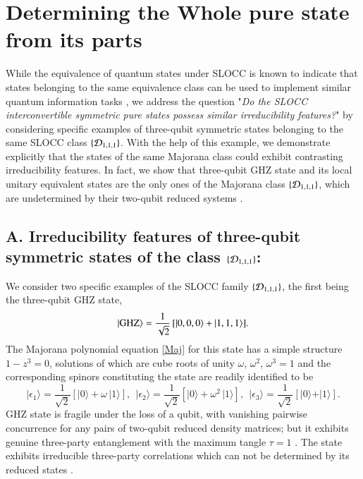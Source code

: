   
\section{Determining the Whole pure state from its parts}\label{chap29-eqIV} 

While the equivalence of quantum states under SLOCC is known to indicate that states belonging to the same equivalence class can be used to implement similar quantum information tasks \cite{Dur}, we address the question "{\emph{Do the {\rm SLOCC} interconvertible symmetric pure states possess similar irreducibility features?}}" by considering specific examples of three-qubit symmetric states belonging to the same SLOCC class $\{{\cal D}_{1,1,1}\}$.  With the help of this example, we demonstrate explicitly that the states of the same Majorana class could exhibit contrasting irreducibility features. In fact, we show that three-qubit GHZ state and its local unitary equivalent states are the only ones of the Majorana class $\{{\cal D}_{1,1,1}\}$,  which are undetermined by their two-qubit reduced systems \cite{SP1,Walck,Walck2}. 

\subsection*{A. Irreducibility features of three-qubit symmetric states of the class $\{{\cal D}_{1,1,1} \}$:}

We consider two specific examples of the SLOCC family $\{{\cal D}_{1,1,1}\}$,  the first being the three-qubit 
GHZ state,  
\begin{equation}
\vert {\rm GHZ}\rangle= \frac{1}{\sqrt{2}}\, [\vert 0,0,0\rangle +  \vert 1,1,1\rangle].\label{GHZ}
\end{equation}      
The Majorana polynomial equation \eqref{Maj} for this state has a simple structure $1-z^3=0$, solutions of which are cube roots of unity $\omega$, $\omega^2$, $\omega^3=1$ and the corresponding spinors constituting the state are readily identified to be 
\begin{equation}
\vert \epsilon_1\rangle =\frac{1}{\sqrt{2}}[\vert 0\rangle+\omega\, \vert 1\rangle],\ \  \vert \epsilon_2\rangle =\frac{1}{\sqrt{2}}[\vert 0\rangle+\omega^2\, \vert 1\rangle], \ \ \vert \epsilon_3\rangle =\frac{1}{\sqrt{2}}[\vert 0\rangle+ \vert 1\rangle].\label{chap29-eq16}
\end{equation}
GHZ state is fragile under the loss of a qubit, with vanishing pairwise concurrence \cite{Wot,Wot2} for any pairs of two-qubit reduced density matrices; but it exhibits genuine three-party entanglement \cite{Dur,RaRe} with the maximum tangle  $\tau=1$ \cite{Kun}.  The state exhibits irreducible three-party correlations which can not be determined by its reduced states \cite{SP1,Walck,Walck2}. 

